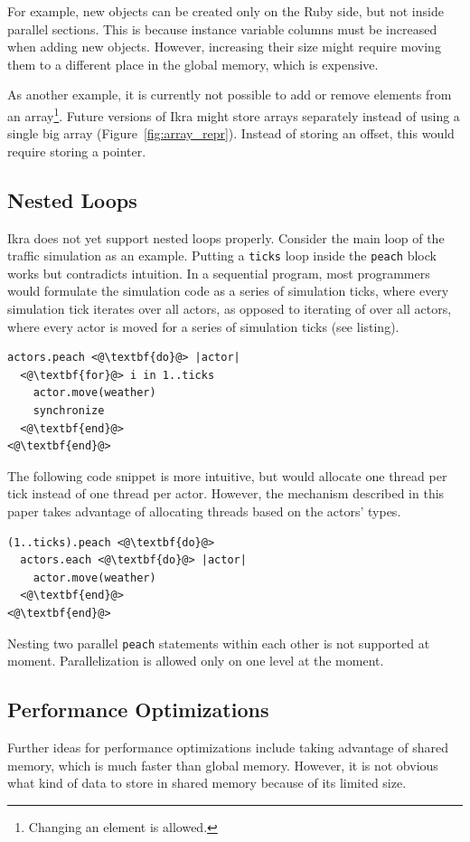 \documentclass[preprint]{sigplanconf}
\begin{document}
For example, new objects can be created only on the Ruby side, but not inside parallel sections. This is because instance variable columns must be increased when adding new objects. However, increasing their size might require moving them to a different place in the global memory, which is expensive.

As another example, it is currently not possible to add or remove elements from an array\footnote{Changing an element is allowed.}. Future versions of Ikra might store arrays separately instead of using a single big array (Figure~\ref{fig:array_repr}). Instead of storing an offset, this would require storing a pointer.

\subsection{Nested Loops}
\label{sec:nested_loops}
Ikra does not yet support nested loops properly. Consider the main loop of the traffic simulation as an example. Putting a \texttt{ticks} loop inside the \texttt{peach} block works but contradicts intuition. In a sequential program, most programmers would formulate the simulation code as a series of simulation ticks, where every simulation tick iterates over all actors, as opposed to iterating of over all actors, where every actor is moved for a series of simulation ticks (see listing).

\begin{lstlisting}
actors.peach <@\textbf{do}@> |actor|
  <@\textbf{for}@> i in 1..ticks
    actor.move(weather)
    synchronize
  <@\textbf{end}@>
<@\textbf{end}@>
\end{lstlisting}

The following code snippet is more intuitive, but would allocate one thread per tick instead of one thread per actor. However, the mechanism described in this paper takes advantage of allocating threads based on the actors' types.
\begin{lstlisting}
(1..ticks).peach <@\textbf{do}@>
  actors.each <@\textbf{do}@> |actor|
    actor.move(weather)
  <@\textbf{end}@>
<@\textbf{end}@>
\end{lstlisting}

Nesting two parallel \texttt{peach} statements within each other is not supported at moment. Parallelization is allowed only on one level at the moment.

\subsection{Performance Optimizations}
Further ideas for performance optimizations include taking advantage of shared memory, which is much faster than global memory. However, it is not obvious what kind of data to store in shared memory because of its limited size.
\end{document}
